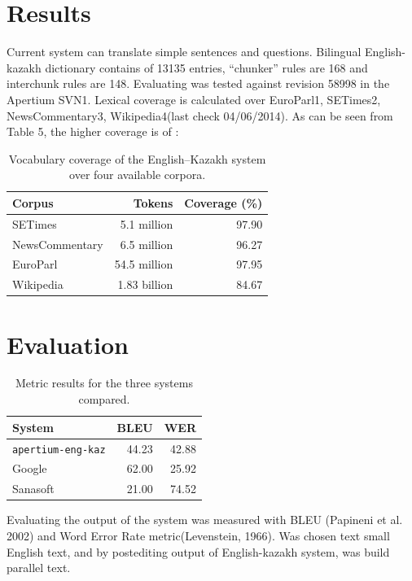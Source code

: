 \documentclass[11pt]{article}
\begin{document}
\section{Results}

Current system can translate simple sentences and questions. Bilingual English-kazakh dictionary contains of  13135 entries, ``chunker'' rules are 168 and interchunk rules are 148. 
Evaluating was tested against  revision 58998 in the Apertium SVN1. Lexical coverage is calculated over EuroParl1, SETimes2, NewsCommentary3, Wikipedia4(last check 04/06/2014). As can be seen from  Table 5, the higher coverage is of : 

\begin{table}
  \centering
  \begin{tabular}{|l|r|r|}
    \hline
    \textbf{Corpus} & \textbf{Tokens} & \textbf{Coverage} (\%) \\
    \hline
    SETimes & 5.1 million & 97.90 \\
    NewsCommentary & 6.5 million & 96.27 \\
    EuroParl & 54.5 million & 97.95 \\
    Wikipedia & 1.83 billion & 84.67 \\
    \hline
  \end{tabular}
  \caption{Vocabulary coverage of the English--Kazakh system over four available corpora.}
\end{table}

\section{Evaluation}

\begin{table}
  \centering
  \begin{tabular}{|l|r|r|}
    \hline
    \textbf{System} & \textbf{BLEU} & \textbf{WER} \\
    \hline
    \texttt{apertium-eng-kaz} & 44.23 & 42.88 \\
    Google & 62.00 & 25.92 \\
    Sanasoft & 21.00 & 74.52 \\
    \hline
  \end{tabular}
  \caption{Metric results for the three systems compared.}
  \label{table:metrics}
\end{table}

Evaluating the output of the system was measured with BLEU (Papineni et al. 2002) and Word Error Rate metric(Levenstein, 1966).  Was chosen text small English text, and by postediting output of English-kazakh system, was build parallel text.
\end{document}

